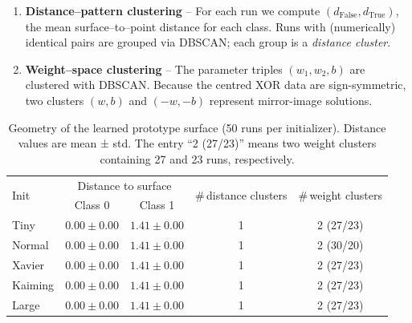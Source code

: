 \begin{enumerate}[label=(G\arabic*)]
    \item \textbf{Distance–pattern clustering} –  
          For each run we compute \((d_{\text{False}},d_{\text{True}})\),
          the mean surface–to–point distance for each class.
          Runs with (numerically) identical pairs are grouped via DBSCAN;
          each group is a \emph{distance cluster}.
    \item \textbf{Weight–space clustering} –  
          The parameter triples \((w_1,w_2,b)\) are clustered with DBSCAN.
          Because the centred XOR data are sign-symmetric, two clusters
          \((w,b)\) and \((-w,-b)\) represent mirror-image solutions.
\end{enumerate}

\begin{table}[h]
\centering
\caption{Geometry of the learned prototype surface (50 runs per
initializer).  Distance values are mean ± std.  The entry
“2 (27/23)” means two weight clusters containing 27 and 23 runs,
respectively.}
\label{tab:init-geometry}
\begin{tabular}{lcccc}
\toprule
\multirow{2}{*}{Init} &
\multicolumn{2}{c}{Distance to surface} &
\multirow{2}{*}{\#\,distance clusters} &
\multirow{2}{*}{\#\,weight clusters} \\
\cmidrule(lr){2-3}
 & Class 0 & Class 1 & & \\
\midrule
Tiny    & $0.00\pm0.00$ & $1.41\pm0.00$ & 1 & 2 (27/23) \\
Normal  & $0.00\pm0.00$ & $1.41\pm0.00$ & 1 & 2 (30/20) \\
Xavier  & $0.00\pm0.00$ & $1.41\pm0.00$ & 1 & 2 (27/23) \\
Kaiming & $0.00\pm0.00$ & $1.41\pm0.00$ & 1 & 2 (27/23) \\
Large   & $0.00\pm0.00$ & $1.41\pm0.00$ & 1 & 2 (27/23) \\
\bottomrule
\end{tabular}
\end{table}

